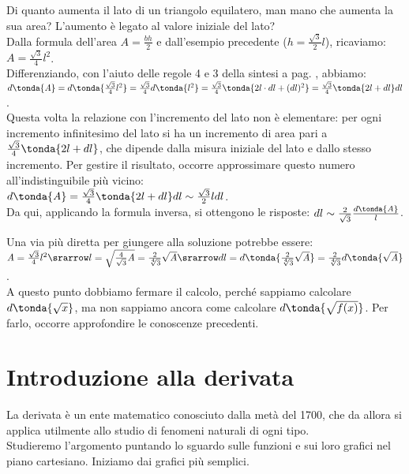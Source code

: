 \begin{esempio}
Di quanto aumenta il lato di un triangolo equilatero,
man mano che aumenta la sua area? L'aumento è legato al valore iniziale del 
lato?\\
Dalla formula dell'area $\mathit{A}=\frac{bh}{2}$ e dall'esempio precedente
($h=\frac{\sqrt{3}}{2}l$), ricaviamo: $\mathit{A}=\frac{\sqrt{3}}{4}l^2$.\\
Differenziando, con l'aiuto delle regole 4 e 3 della sintesi a pag.
\pageref{subsubsec:diff01_diffsint}, abbiamo:\\
$d\tonda{\mathit{A}}=d\tonda{\frac{\sqrt{3}}{4}l^2}=
 \frac{\sqrt{3}}{4}d\tonda{l^2}=
 \frac{\sqrt{3}}{4}\tonda{2l \cdot dl+(dl)^2}=
 \frac{\sqrt{3}}{4}\tonda{2l+dl}dl$.\\
Questa volta la relazione con l'incremento del lato non è elementare: per 
ogni incremento infinitesimo del lato si ha un incremento di area pari a 
$\frac{\sqrt{3}}{4}\tonda{2l+dl}$, che dipende dalla misura iniziale del 
lato e dallo stesso incremento. Per gestire il risultato, occorre approssimare
questo numero all'indistinguibile più vicino:\\
$d\tonda{\mathit{A}}=\frac{\sqrt{3}}{4}\tonda{2l+dl}dl\sim
\frac{\sqrt{3}}{2}ldl$.\\
Da qui, applicando la formula inversa, si ottengono le 
risposte:
$dl\sim\frac{2}{\sqrt{3}}\frac{d\tonda{\mathit{A}}}{l}$.
\begin{osservazione}
 Una via più diretta per giungere alla soluzione potrebbe essere: \\
 $\mathit{A}=\frac{\sqrt{3}}{4}l^2\srarrow 
l=\sqrt{\frac{4}{\sqrt{3}}\mathit{A}}=
 \frac{2}{\sqrt[4]{3}}\sqrt{\mathit{A}}\srarrow dl=
 d\tonda{\frac{2}{\sqrt[4]{3}}\sqrt{\mathit{A}}}=
 \frac{2}{\sqrt[4]{3}}d\tonda{\sqrt{\mathit{A}}}$.\\
 A questo punto dobbiamo fermare il calcolo, perché 
 sappiamo calcolare $d\tonda{\sqrt{x}}$, ma 
 non sappiamo ancora come calcolare $d\tonda{\sqrt{f(x)}}$. Per farlo, 
 occorre approfondire le conoscenze precedenti.
\end{osservazione}
\end{esempio}

\section{Introduzione alla derivata}
\label{sec:diff01_derivata}
La derivata è un ente matematico conosciuto dalla metà del 1700, che 
da allora si applica utilmente allo studio di fenomeni naturali di ogni 
tipo.\\
Studieremo l'argomento puntando lo sguardo sulle funzioni e sui loro
grafici nel piano cartesiano. Iniziamo dai grafici più semplici.


